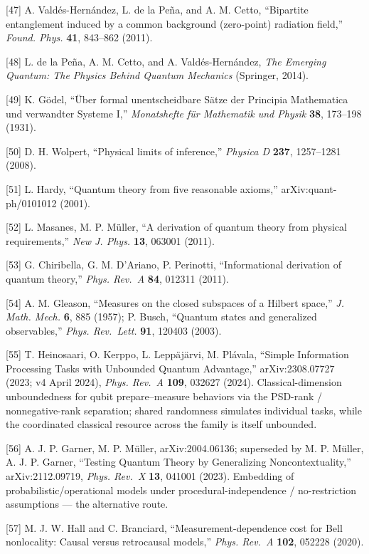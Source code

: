 \documentclass[
]{article}
\begin{document}
{[}47{]} A. Valdés-Hernández, L. de la Peña, and A. M. Cetto,
``Bipartite entanglement induced by a common background (zero-point)
radiation field,'' \emph{Found. Phys.} \textbf{41}, 843--862 (2011).

{[}48{]} L. de la Peña, A. M. Cetto, and A. Valdés-Hernández, \emph{The
Emerging Quantum: The Physics Behind Quantum Mechanics} (Springer,
2014).

{[}49{]} K. Gödel, ``Über formal unentscheidbare Sätze der Principia
Mathematica und verwandter Systeme I,'' \emph{Monatshefte für Mathematik
und Physik} \textbf{38}, 173--198 (1931).

{[}50{]} D. H. Wolpert, ``Physical limits of inference,'' \emph{Physica
D} \textbf{237}, 1257--1281 (2008).

{[}51{]} L. Hardy, ``Quantum theory from five reasonable axioms,''
arXiv:quant-ph/0101012 (2001).

{[}52{]} L. Masanes, M. P. Müller, ``A derivation of quantum theory from
physical requirements,'' \emph{New J. Phys.} \textbf{13}, 063001 (2011).

{[}53{]} G. Chiribella, G. M. D'Ariano, P. Perinotti, ``Informational
derivation of quantum theory,'' \emph{Phys. Rev.~A} \textbf{84}, 012311
(2011).

{[}54{]} A. M. Gleason, ``Measures on the closed subspaces of a Hilbert
space,'' \emph{J. Math. Mech.} \textbf{6}, 885 (1957); P. Busch,
``Quantum states and generalized observables,'' \emph{Phys. Rev.~Lett.}
\textbf{91}, 120403 (2003).

{[}55{]} T. Heinosaari, O. Kerppo, L. Leppäjärvi, M. Plávala, ``Simple
Information Processing Tasks with Unbounded Quantum Advantage,''
arXiv:2308.07727 (2023; v4 April 2024), \emph{Phys. Rev.~A}
\textbf{109}, 032627 (2024). Classical-dimension unboundedness for qubit
prepare--measure behaviors via the PSD-rank / nonnegative-rank
separation; shared randomness simulates individual tasks, while the
coordinated classical resource across the family is itself unbounded.

{[}56{]} A. J. P. Garner, M. P. Müller, arXiv:2004.06136; superseded by
M. P. Müller, A. J. P. Garner, ``Testing Quantum Theory by Generalizing
Noncontextuality,'' arXiv:2112.09719, \emph{Phys. Rev.~X} \textbf{13},
041001 (2023). Embedding of probabilistic/operational models under
procedural-independence / no-restriction assumptions --- the alternative
route.

{[}57{]} M. J. W. Hall and C. Branciard, ``Measurement-dependence cost
for Bell nonlocality: Causal versus retrocausal models,'' \emph{Phys.
Rev.~A} \textbf{102}, 052228 (2020).
\end{document}
